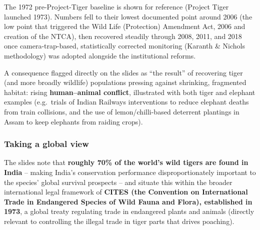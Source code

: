 \documentclass[11pt,a4paper]{article}
\begin{document}
\begin{figbox}[title={Estimated tiger numbers in India, 1972--2018}]
\centering
{}

\vspace{1mm}
\footnotesize The 1972 pre-Project-Tiger baseline is shown for reference (Project Tiger launched 1973). Numbers fell to their lowest documented point around 2006 (the low point that triggered the Wild Life (Protection) Amendment Act, 2006 and creation of the NTCA), then recovered steadily through 2008, 2011, and 2018 once camera-trap-based, statistically corrected monitoring (Karanth \& Nichols methodology) was adopted alongside the institutional reforms.
\end{figbox}

A consequence flagged directly on the slides as ``the result'' of recovering tiger (and more broadly wildlife) populations pressing against shrinking, fragmented habitat: rising \textbf{human--animal conflict}, illustrated with both tiger and elephant examples (e.g.\ trials of Indian Railways interventions to reduce elephant deaths from train collisions, and the use of lemon/chilli-based deterrent plantings in Assam to keep elephants from raiding crops).

\subsubsection{Taking a global view}
The slides note that \textbf{roughly 70\% of the world's wild tigers are found in India} -- making India's conservation performance disproportionately important to the species' global survival prospects -- and situate this within the broader international legal framework of \textbf{CITES (the Convention on International Trade in Endangered Species of Wild Fauna and Flora), established in 1973}, a global treaty regulating trade in endangered plants and animals (directly relevant to controlling the illegal trade in tiger parts that drives poaching).
\end{document}
